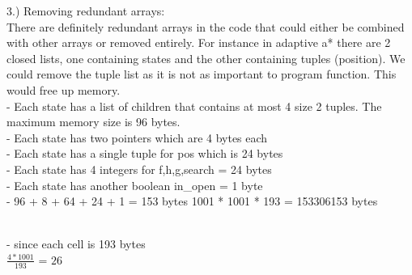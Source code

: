 \documentclass{article}
\begin{document}
\bigskip{}
3.) Removing redundant arrays:\\
There are definitely redundant arrays in the code that could either be combined with other arrays or removed entirely. For instance in adaptive a* there are 2 closed lists, one containing states and the other containing tuples (position). We could remove the tuple list as it is not as important to program function. This would free up memory. \\
\bigskip{}
- Each state has a list of children that contains at most 4 size 2 tuples. The maximum memory size is 96 bytes.\\

- Each state has two pointers which are 4 bytes each \\ 

 - Each state has a single tuple for pos which is 24 bytes\\
 
 - Each state has 4 integers for f,h,g,search = 24 bytes\\
 
 - Each state has another boolean in\_open = 1 byte \\
 
 - 96 + 8 + 64 + 24 + 1 = 153 bytes
 1001 * 1001 * 193 = 153306153 bytes
 
\\
- since each cell is 193 bytes \\
$\frac{4 * 1001}{193}$ = $26$
\end{document}
